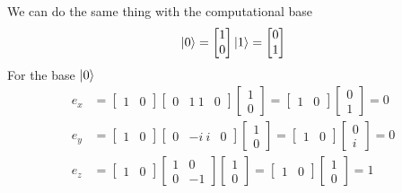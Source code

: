 \documentclass[../../../main.tex]{subfiles}
\begin{document}
We can do the same thing with the computational base
\begin{equation*}
    \ket{0} = \begin{bmatrix}
        1 \\0
    \end{bmatrix}
    \ket{1} = \begin{bmatrix}
        0 \\1
    \end{bmatrix}
\end{equation*}
For the base $\ket{0}$
\begin{align*}
    e_x & =
    \begin{bmatrix} 1 & 0 \end{bmatrix}
    \begin{bmatrix} 0 & 1 \ 1 & 0 \end{bmatrix}
    \begin{bmatrix} 1 \\ 0 \end{bmatrix} =
    \begin{bmatrix} 1 & 0 \end{bmatrix}
    \begin{bmatrix} 0 \\ 1 \end{bmatrix} = 0 \\
    e_y & =
    \begin{bmatrix} 1 & 0 \end{bmatrix}
    \begin{bmatrix} 0 & -i \ i & 0 \end{bmatrix}
    \begin{bmatrix} 1 \\ 0 \end{bmatrix} =
    \begin{bmatrix} 1 & 0 \end{bmatrix}
    \begin{bmatrix} 0 \\ i \end{bmatrix} = 0 \\
    e_z & =
    \begin{bmatrix} 1 & 0 \end{bmatrix}
    \begin{bmatrix} 1 & 0 \\ 0 & -1 \end{bmatrix}
    \begin{bmatrix} 1 \\ 0 \end{bmatrix} =
    \begin{bmatrix} 1 & 0 \end{bmatrix}
    \begin{bmatrix} 1 \\ 0 \end{bmatrix} = 1
\end{align*}
\end{document}

